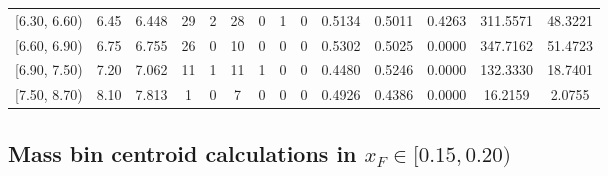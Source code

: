 \begin{table}[htbp]
{\begin{tabular}{cc|c|cccccc|ccc|cc}
        {[6.30, 6.60)} & 6.45 & 6.448 & 29 & 2 & 28 & 0 & 1 & 0 & 0.5134 & 0.5011 & 0.4263 & 311.5571 & 48.3221 \\
        {[6.60, 6.90)} & 6.75 & 6.755 & 26 & 0 & 10 & 0 & 0 & 0 & 0.5302 & 0.5025 & 0.0000 & 347.7162 & 51.4723 \\
        {[6.90, 7.50)} & 7.20 & 7.062 & 11 & 1 & 11 & 1 & 0 & 0 & 0.4480 & 0.5246 & 0.0000 & 132.3330 & 18.7401 \\
        {[7.50, 8.70)} & 8.10 & 7.813 & 1 & 0 & 7 & 0 & 0 & 0 & 0.4926 & 0.4386 & 0.0000 & 16.2159 & 2.0755 \\
        \hline\hline
    \end{tabular}
    }
\end{table}

\clearpage
\subsection{\texorpdfstring{Mass bin centroid calculations in $x_F \in [0.15, 0.20)$}{Mass bin centroid calculations in x\_F in [0.15, 0.20)]}}

